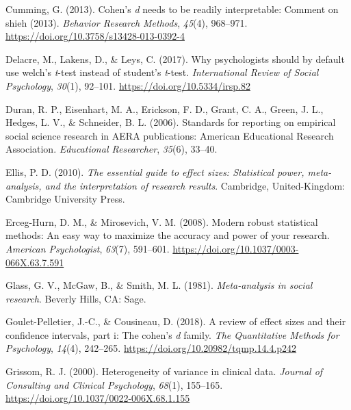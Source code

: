 \documentclass[
  english,
  man,floatsintext]{apa6}
\newlength{\cslhangindent}
\newlength{\cslentryspacingunit} %
\newenvironment{CSLReferences}[2] %
 {%
  \setlength{\parindent}{0pt}
  \ifodd #1
  \let\oldpar\par
  \def\par{\hangindent=\cslhangindent\oldpar}
  \fi
  \setlength{\parskip}{#2\cslentryspacingunit}
 }%
 {}
\begin{document}
\begin{CSLReferences}{1}{0}
\leavevmode{}%
Cumming, G. (2013). Cohen's \emph{d} needs to be readily interpretable: Comment on shieh (2013). \emph{Behavior Research Methods}, \emph{45}(4), 968--971. \url{https://doi.org/10.3758/s13428-013-0392-4}

\leavevmode{}%
Delacre, M., Lakens, D., \& Leys, C. (2017). Why psychologists should by default use welch's \emph{t}-test instead of student's \emph{t}-test. \emph{International Review of Social Psychology}, \emph{30}(1), 92--101. \url{https://doi.org/10.5334/irsp.82}

\leavevmode{}%
Duran, R. P., Eisenhart, M. A., Erickson, F. D., Grant, C. A., Green, J. L., Hedges, L. V., \& Schneider, B. L. (2006). Standards for reporting on empirical social science research in {AERA} publications: {A}merican {E}ducational {R}esearch {A}ssociation. \emph{Educational Researcher}, \emph{35}(6), 33--40.

\leavevmode{}%
Ellis, P. D. (2010). \emph{The essential guide to effect sizes: Statistical power, meta-analysis, and the interpretation of research results}. Cambridge, United-Kingdom: Cambridge University Press.

\leavevmode{}%
Erceg-Hurn, D. M., \& Mirosevich, V. M. (2008). Modern robust statistical methods: An easy way to maximize the accuracy and power of your research. \emph{American Psychologist}, \emph{63}(7), 591--601. \url{https://doi.org/10.1037/0003-066X.63.7.591}

\leavevmode{}%
Glass, G. V., McGaw, B., \& Smith, M. L. (1981). \emph{Meta-analysis in social research}. Beverly Hills, {CA}: Sage.

\leavevmode{}%
Goulet-Pelletier, J.-C., \& Cousineau, D. (2018). A review of effect sizes and their confidence intervals, part i: The cohen's \emph{d} family. \emph{The Quantitative Methods for Psychology}, \emph{14}(4), 242--265. \url{https://doi.org/10.20982/tqmp.14.4.p242}

\leavevmode{}%
Grissom, R. J. (2000). Heterogeneity of variance in clinical data. \emph{Journal of Consulting and Clinical Psychology}, \emph{68}(1), 155--165. \url{https://doi.org/10.1037/0022-006X.68.1.155}


\end{CSLReferences}
\end{document}

